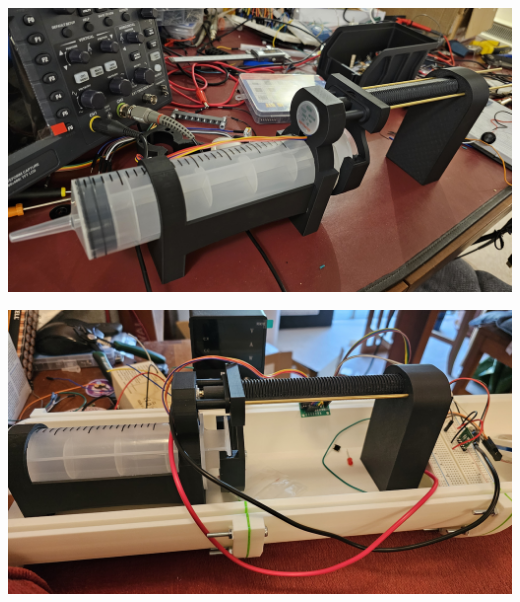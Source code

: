 \documentclass[11pt,a4paper,titlepage]{report}
\begin{document}
	\begin{center}
		\label{picture:images_parts_2}
		\includegraphics[width=\linewidth]{assets/DepthController1.jpg}
	\end{center}
	\begin{center}
		\label{picture:images_parts_3}
		\includegraphics[width=\linewidth]{assets/DepthController2.jpg}
	\end{center}
\end{document}
